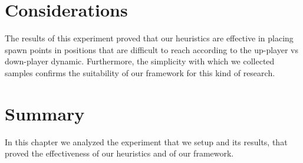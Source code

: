 
\section{Considerations}

The results of this experiment proved that our heuristics are effective in placing spawn points in positions that are difficult to reach according to the up-player vs down-player dynamic. Furthermore, the simplicity with which we collected samples confirms the suitability of our framework for this kind of research.


\section{Summary}

In this chapter we analyzed the experiment that we setup and its results, that proved the effectiveness of our heuristics and of our framework.